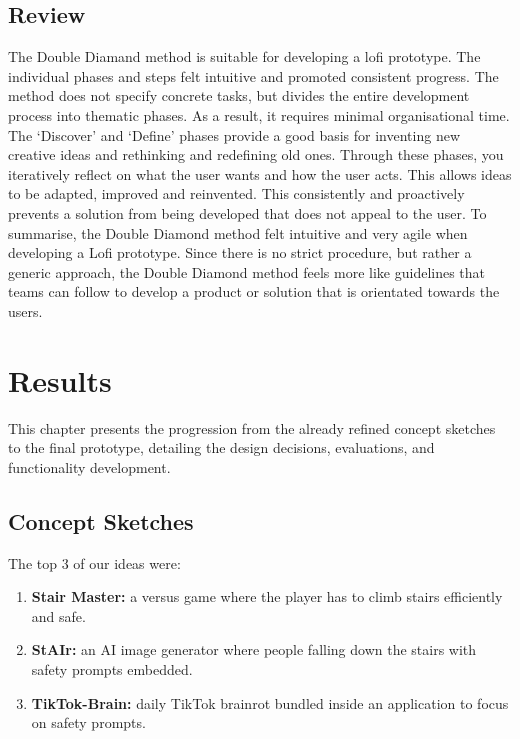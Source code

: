 \documentclass{article}
\begin{document}
\subsection{Review}
The Double Diamand method is suitable for developing a lofi prototype. The individual phases and steps felt intuitive and promoted consistent progress. The method does not specify concrete tasks, but divides the entire development process into thematic phases. As a result, it requires minimal organisational time. The ‘Discover’ and ‘Define’ phases provide a good basis for inventing new creative ideas and rethinking and redefining old ones. Through these phases, you iteratively reflect on what the user wants and how the user acts. This allows ideas to be adapted, improved and reinvented. This consistently and proactively prevents a solution from being developed that does not appeal to the user.
To summarise, the Double Diamond method felt intuitive and very agile when developing a Lofi prototype. Since there is no strict procedure, but rather a generic approach, the Double Diamond method feels more like guidelines that teams can follow to develop a product or solution that is orientated towards the users.


\section{Results}
This chapter presents the progression from the already refined concept sketches to the final prototype,
detailing the design decisions, evaluations, and functionality development.

\subsection{Concept Sketches}
The top 3 of our ideas were:

\begin{enumerate}
    \item \textbf{Stair Master:} a versus game where the player has to climb stairs efficiently and safe.
    \item \textbf{StAIr:} an AI image generator where people falling down the stairs with safety prompts embedded.
    \item \textbf{TikTok-Brain:} daily TikTok brainrot bundled inside an application to focus on safety prompts.
\end{enumerate}

\pagebreak
\end{document}
